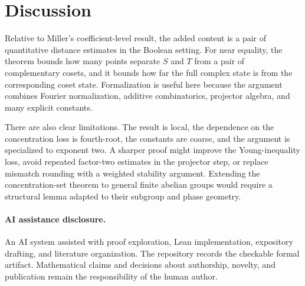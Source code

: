 \documentclass[11pt]{article}
\theoremstyle{remark}
\newcommand{\1}{\mathbf 1}
\begin{document}
\section{Discussion}

Relative to Miller's coefficient-level result, the added content is a pair
of quantitative distance estimates in the Boolean setting. For near
equality, the theorem bounds how many points separate $S$ and $T$ from a
pair of complementary cosets, and it bounds how far the full complex state
is from the corresponding coset state. Formalization is useful here because
the argument combines Fourier normalization, additive combinatorics,
projector algebra, and many explicit constants.

There are also clear limitations. The result is local, the dependence on
the concentration loss is fourth-root, the constants are coarse, and the
argument is specialized to exponent two. A sharper proof might improve the
Young-inequality loss, avoid repeated factor-two estimates in the projector
step, or replace mismatch rounding with a weighted stability argument.
Extending the concentration-set theorem to general finite abelian groups
would require a structural lemma adapted to their subgroup and phase
geometry.

\paragraph{AI assistance disclosure.}
An AI system assisted with proof exploration, Lean implementation,
expository drafting, and literature organization. The repository records
the checkable formal artifact. Mathematical claims and decisions about
authorship, novelty, and publication remain the responsibility of the human
author.



\end{document}
